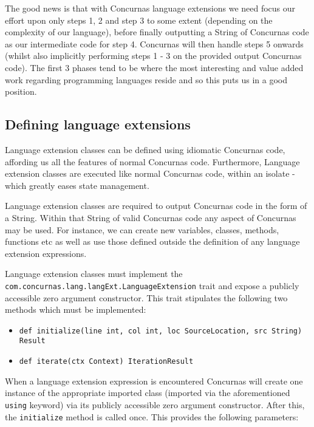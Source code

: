 \documentclass[conc-doc]{subfiles}
\begin{document}
The good news is that with Concurnas language extensions we need focus our effort upon only steps 1, 2 and step 3 to some extent (depending on the complexity of our language), before finally outputting a String of Concurnas code as our intermediate code for step 4. Concurnas will then handle steps 5 onwards (whilst also implicitly performing steps 1 - 3 on the provided output Concurnas code). The first 3 phases tend to be where the most interesting and value added work regarding programming languages reside and so this puts us in a good position.

\subsection{Defining language extensions}
Language extension classes can be defined using idiomatic Concurnas code, affording us all the features of normal Concurnas code. Furthermore, Language extension classes are executed like normal Concurnas code, within an isolate - which greatly eases state management. 

Language extension classes are required to output Concurnas code in the form of a String. Within that String of valid Concurnas code any aspect of Concurnas may be used. For instance, we can create new variables, classes, methods, functions etc as well as use those defined outside the definition of any language extension expressions.

Language extension classes must implement the \lstinline{com.concurnas.lang.langExt.LanguageExtension} trait and expose a publicly accessible zero argument constructor. This trait stipulates the following two methods which must be implemented:

\begin{itemize}
	\item \lstinline{def initialize(line int, col int, loc SourceLocation, src String) Result}
	\item \lstinline{def iterate(ctx Context) IterationResult}
\end{itemize}

When a language extension expression is encountered Concurnas will create one instance of the appropriate imported class (imported via the aforementioned \lstinline{using} keyword) via its publicly accessible zero argument constructor. After this, the \lstinline{initialize} method is called once. This provides the following parameters:
\end{document}

